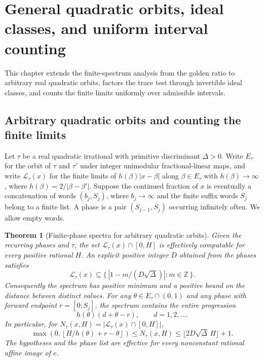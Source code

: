 \documentclass[11pt]{amsart}
\newtheorem{theorem}{Theorem}[section]
\theoremstyle{definition}
\theoremstyle{remark}
\numberwithin{equation}{section}
\newcommand{\Z}{\mathbb{Z}}
\begin{document}
\section{General quadratic orbits, ideal classes, and uniform interval counting}\label{sec:quadratic}

This chapter extends the finite-spectrum analysis from the golden
ratio to arbitrary real quadratic orbits, factors the trace test
through invertible ideal classes, and counts the finite limits
uniformly over admissible intervals.
\subsection{Arbitrary quadratic orbits and counting the finite limits}
Let $\tau$ be a real quadratic irrational with primitive discriminant
$\Delta>0$. Write $E_\tau$ for the orbit of $\tau$ and $\tau'$ under
integer unimodular fractional-linear maps, and write
$\mathcal L_\tau(x)$ for the finite limits of
$h(\beta)|x-\beta|$ along $\beta\in E_\tau$ with $h(\beta)\to\infty$,
where $h(\beta)=2/|\beta-\beta'|$.
Suppose the continued fraction of $x$ is eventually a concatenation of
words $(b_j,S_j)$, where $b_j\to\infty$ and the finite suffix words $S_j$
belong to a finite list. A phase is a pair $(S_{j-1},S_j)$ occurring
infinitely often. We allow empty words.

\begin{theorem}[Finite-phase spectra for arbitrary quadratic orbits]\label{thm:general-quadratic-phase}
Given the recurring phases and $\tau$, the set
$\mathcal L_\tau(x)\cap[0,H]$ is effectively computable for every positive
rational $H$. An explicit positive integer $D$ obtained from the phases
satisfies
\[
 \mathcal L_\tau(x)\subseteq
 \{\,|1-m/(D\sqrt\Delta)|:m\in\Z\,\}.
\]
Consequently the spectrum has positive minimum and a positive bound on
the distance between distinct values. For any $\theta\in E_\tau\cap(0,1)$
and any phase with forward endpoint $r=[0;S_j]$, the spectrum contains
the entire progression
\[
 h(\theta)(d+\theta-r),\qquad d=1,2,\ldots .
\]
In particular, for $N_\tau(x,H)=|\mathcal L_\tau(x)\cap[0,H]|$,
\[
 \max\!\left(0,\left\lfloor H/h(\theta)+r-\theta\right\rfloor\right)
 \le N_\tau(x,H)\le \lfloor 2D\sqrt\Delta\,H\rfloor+1.
\]
The hypotheses and the phase list are effective for every nonconstant
rational affine image of $e$.
\end{theorem}
\end{document}
